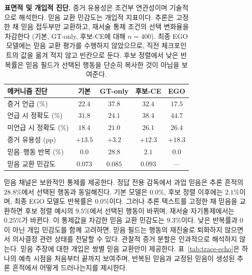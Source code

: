\documentclass[letterpaper]{article}
\newcommand{\obs}[1]{\textcolor{measuredblue}{#1}}
\newcommand{\method}{\textsc{EGO}}
\begin{document}
\begin{table}[t]
\centering
\scriptsize
\setlength{\tabcolsep}{2.5pt}
\begin{tabular}{lcccc}
\toprule
메커니즘 진단 & 기본 & GT-only & 후보-CE & \method{} \\
\midrule
증거 언급 (\%) & \obs{$22.4$} & \obs{$37.8$} & \obs{$32.4$} & \obs{$17.5$} \\
언급 시 정확도 (\%) & \obs{$31.8$} & \obs{$24.1$} & \obs{$38.4$} & \obs{$44.7$} \\
미언급 시 정확도 (\%) & \obs{$18.4$} & \obs{$21.0$} & \obs{$26.1$} & \obs{$26.4$} \\
증거 유용성 (pp) & \obs{$+13.5$} & \obs{$+3.2$} & \obs{$+12.3$} & \obs{$+18.3$} \\
\midrule
믿음--행동 반복 (\%) & \obs{$0.0$} & \obs{$28.8$} & \obs{$2.1$} & \obs{$0.0$} \\
믿음 교환 민감도 & \obs{$0.073$} & \obs{$0.085$} & \obs{$0.093$} & --- \\
\bottomrule
\end{tabular}
\caption{\textbf{표면적 및 개입적 진단.} 증거 유용성은 조건부 연관성이며
기술적으로 해석한다. 믿음 교환 민감도는 개입적 지표이다. 추론은 고정한 채
믿음 접두부만 교환하고, 재서술 통제 조건의 선택 변화율을 차감한다
(기본, GT-only, 후보-CE에 대해 \obs{$n{=}400$}).
최종 \method{} 모델에는 믿음 교환 평가를 수행하지 않았으므로, 직전
체크포인트의 값을 옮겨 적지 않고 빈칸으로 둔다.
후보 정렬에서 낮은 반복률은 믿음 필드가 선택된 행동을
단순히 복사한 것이 아님을 보여준다.}
\label{tab:mechanism}
\end{table}

믿음 채널은 보완적인 통제를 제공한다. 정답 전용 감독에서 과업 믿음은 추론 흔적의
\obs{$28.8\%$}에서 선택된 행동과 동일해진다. 기본 모델은 \obs{$0.0\%$},
후보 정렬 이후에는 \obs{$2.1\%$}이며, 최종 \method{} 모델도 반복률은
\obs{$0.0\%$}이다. 그러나 추론 텍스트를 고정한 채 믿음을
교환하면 후보 정렬 예시의 \obs{$9.5\%$}에서 선택된 행동이 바뀌며, 재서술
자기통제에서는 \obs{$0.25\%$}가 바뀐다. 이 통제값을 차감한 믿음 교환 민감도는
\obs{$9.3\%$}이다. 낮은 반복률과 0이 아닌
개입 민감도를 함께 고려하면, 믿음 필드는 행동의 재진술로 퇴화하지 않으면서
의사결정 관련 상태를 전달할 수 있다. 관찰적 증거 분할은 인과적으로 해석하지
않는다. 믿음 주장에 대한 개입은 쌍별 믿음 교환만이 제공한다.
표~\ref{tab:trace-echo}은 하나의 예측 시점을 처음부터 끝까지 보여주며,
반복된 믿음과 교정된 믿음이 생성된 추론 흔적에서 어떻게 드러나는지를 제시한다.
\end{document}
